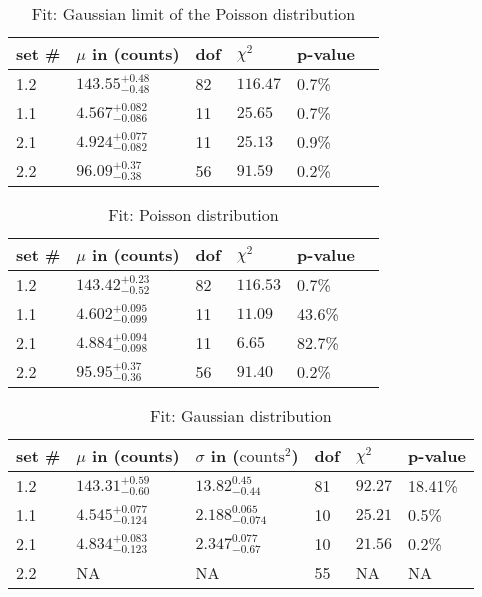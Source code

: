 \documentclass[%
 reprint,
 amsmath,amssymb,
 aps,
]{revtex4-1}
\begin{document}
\begin{table}[!htbp]
\centering
\caption{Fit: Gaussian limit of the Poisson distribution}
\begin{tabular}{|l|l|l|l|l|l|}
\hline
set \# & $\mu$ in (counts) & dof & $\chi^2$ & p-value \\ \hline
1.2 & $143.55_{-0.48}^{+0.48}$ & 82 & $116.47$ & 0.7\% \\ \hline
1.1 & $4.567_{-0.086}^{+0.082}$ & 11 & $25.65$ & 0.7\% \\ \hline
2.1 & $4.924_{-0.082}^{+0.077}$ & 11 & $25.13$ & 0.9\% \\ \hline
2.2 & $96.09_{-0.38}^{+0.37}$ & 56 & $91.59$ & 0.2\% \\ \hline
\end{tabular}
\end{table}

\begin{table}[!htbp]
\centering
\caption{Fit: Poisson distribution}
\begin{tabular}{|l|l|l|l|l|l|}
\hline
set \# & $\mu$ in (counts) & dof & $\chi^2$ & p-value \\ \hline
1.2 & $143.42_{-0.52}^{+0.23}$ & 82 & $116.53$ & 0.7\% \\ \hline
1.1 & $4.602_{-0.099}^{+0.095}$ & 11 & $11.09$ & 43.6\% \\ \hline
2.1 & $4.884_{-0.098}^{+0.094}$ & 11 & $6.65$ & 82.7\% \\ \hline
2.2 & $95.95_{-0.36}^{+0.37}$ & 56 & $91.40$ & 0.2\% \\ \hline
\end{tabular}
\end{table}

\begin{table}[!htbp]
\centering
\caption{Fit: Gaussian distribution}
\begin{tabular}{|l|l|l|l|l|l|}
\hline
set \# & $\mu$ in (counts) & $\sigma$ in ($\text{counts}^2$) & dof & $\chi^2$ & p-value \\ \hline
1.2 & $143.31_{-0.60}^{+0.59}$ & $13.82_{-0.44}^{0.45}$ & 81 & $92.27$ & 18.41\% \\ \hline
1.1 & $4.545_{-0.124}^{+0.077}$ & $2.188_{-0.074}^{0.065}$ & 10 & $25.21$ & 0.5\% \\ \hline
2.1 & $4.834_{-0.123}^{+0.083}$ & $2.347_{-0.67}^{0.077}$ & 10 & $21.56$ & 0.2\% \\ \hline
2.2 & NA & NA & 55 & NA & NA \\ \hline
\end{tabular}
\end{table}
\end{document}
